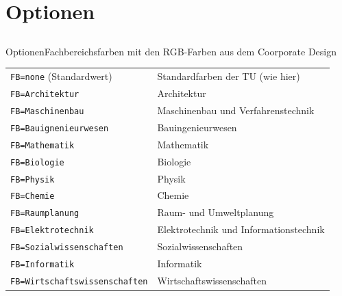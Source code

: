 \documentclass[german,10pt,xcolor=colortbl,compress
]{beamer}
\begin{document}
	\section{Optionen}
	\subsection*{}
	\begin{frame}{Optionen}{Fachbereichsfarben mit den RGB-Farben aus dem Coorporate Design}
				\begin{tabular}{ll}
					\toprule
					\lstinline|FB=none| (Standardwert)& Standardfarben der TU (wie hier)\\
					\lstinline|FB=Architektur| & \colorbox{tuklarchitektur}{\color{white}Architektur}\\
					\lstinline|FB=Maschinenbau| & \colorbox{tuklmaschinenbau}{\color{white}Maschinenbau und Verfahrenstechnik}\\
					\lstinline|FB=Bauignenieurwesen| & \colorbox{tuklbauingenieurwesen}{\color{white}Bauingenieurwesen}\\
					\lstinline|FB=Mathematik| & \colorbox{tuklmathematik}{\color{black}Mathematik}\\
					\lstinline|FB=Biologie| & \colorbox{tuklbiologie}{\color{white}Biologie}\\
					\lstinline|FB=Physik| & \colorbox{tuklphysik}{\color{white}Physik}\\
					\lstinline|FB=Chemie| & \colorbox{tuklchemie}{\color{white}Chemie}\\
					\lstinline|FB=Raumplanung| & \colorbox{tuklraumplanung}{\color{white}Raum- und Umweltplanung}\\
					\lstinline|FB=Elektrotechnik| & \colorbox{tuklelektrotechnik}{\color{white}Elektrotechnik und Informationstechnik}\\
					\lstinline|FB=Sozialwissenschaften| & \colorbox{tuklsozialwissenschaften}{\color{white}Sozialwissenschaften}\\
					\lstinline|FB=Informatik| & \colorbox{tuklinformatik}{\color{white}Informatik}\\
					\lstinline|FB=Wirtschaftswissenschaften| & \colorbox{tuklwirtschaftswissenschaften}{\color{white}Wirtschaftswissenschaften}\\
					\bottomrule
				\end{tabular}
	\end{frame}
\end{document}
